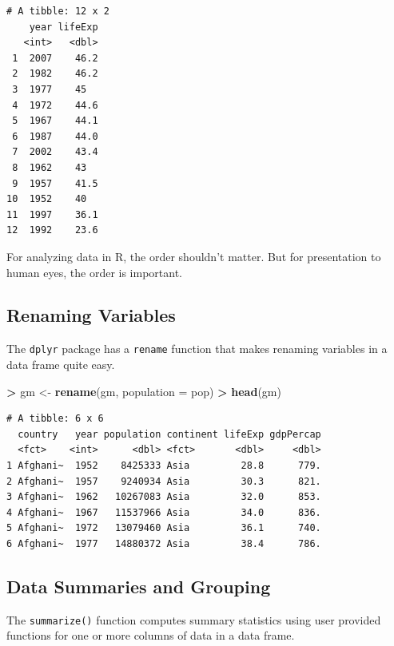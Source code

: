 \documentclass[]{krantz}
\makeatletter
\newenvironment{Shaded}{\begin{snugshade}}{\end{snugshade}}
\newcommand{\DataTypeTok}[1]{\textcolor[rgb]{0.27,0.27,0.27}{#1}}
\newcommand{\KeywordTok}[1]{\textcolor[rgb]{0.27,0.27,0.27}{\textbf{#1}}}
\newcommand{\NormalTok}[1]{#1}
\newcommand{\OperatorTok}[1]{\textcolor[rgb]{0.43,0.43,0.43}{\textbf{#1}}}
\newcommand{\StringTok}[1]{\textcolor[rgb]{0.5,0.5,0.5}{#1}}
\newenvironment{kframe}{%
\medskip{}
\setlength{\fboxsep}{.8em}
 \def\at@end@of@kframe{}%
 \ifinner\ifhmode%
  \def\at@end@of@kframe{\end{minipage}}%
  \begin{minipage}{\columnwidth}%
 \fi\fi%
 \def\FrameCommand##1{\hskip\@totalleftmargin \hskip-\fboxsep
 \colorbox{shadecolor}{##1}\hskip-\fboxsep
     \hskip-\linewidth \hskip-\@totalleftmargin \hskip\columnwidth}%
 \MakeFramed {\advance\hsize-\width
   \@totalleftmargin\z@ \linewidth\hsize
   \@setminipage}}%
 {\par\unskip\endMakeFramed%
 \at@end@of@kframe}
\renewenvironment{Shaded}{\begin{kframe}}{\end{kframe}}
\makeatother
\begin{document}
\begin{verbatim}
# A tibble: 12 x 2
    year lifeExp
   <int>   <dbl>
 1  2007    46.2
 2  1982    46.2
 3  1977    45  
 4  1972    44.6
 5  1967    44.1
 6  1987    44.0
 7  2002    43.4
 8  1962    43  
 9  1957    41.5
10  1952    40  
11  1997    36.1
12  1992    23.6
\end{verbatim}

For analyzing data in R, the order shouldn't matter. But for presentation to human eyes, the order is important.

\hypertarget{renaming-variables}{%
\subsection{Renaming Variables}\label{renaming-variables}}

The \texttt{dplyr} package has a \texttt{rename} function that makes renaming variables in a data frame quite easy.

\begin{Shaded}
\begin{Highlighting}[]
\OperatorTok{>}\StringTok{ }\NormalTok{gm <-}\StringTok{ }\KeywordTok{rename}\NormalTok{(gm, }\DataTypeTok{population =}\NormalTok{ pop)}
\OperatorTok{>}\StringTok{ }\KeywordTok{head}\NormalTok{(gm)}
\end{Highlighting}
\end{Shaded}

\begin{verbatim}
# A tibble: 6 x 6
  country   year population continent lifeExp gdpPercap
  <fct>    <int>      <dbl> <fct>       <dbl>     <dbl>
1 Afghani~  1952    8425333 Asia         28.8      779.
2 Afghani~  1957    9240934 Asia         30.3      821.
3 Afghani~  1962   10267083 Asia         32.0      853.
4 Afghani~  1967   11537966 Asia         34.0      836.
5 Afghani~  1972   13079460 Asia         36.1      740.
6 Afghani~  1977   14880372 Asia         38.4      786.
\end{verbatim}

\hypertarget{data-summaries-and-grouping}{%
\subsection{Data Summaries and Grouping}\label{data-summaries-and-grouping}}

The \texttt{summarize()} function computes summary statistics using user provided functions for one or more columns of data in a data frame.
\end{document}
